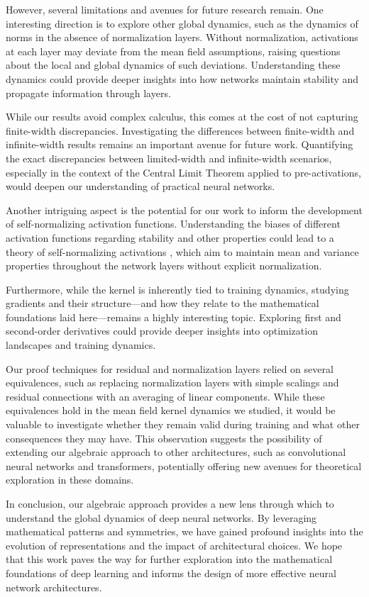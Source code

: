 \documentclass[twoside]{article}
\theoremstyle{definition}
\begin{document}
However, several limitations and avenues for future research remain. One interesting direction is to explore other global dynamics, such as the dynamics of norms in the absence of normalization layers. Without normalization, activations at each layer may deviate from the mean field assumptions, raising questions about the local and global dynamics of such deviations. Understanding these dynamics could provide deeper insights into how networks maintain stability and propagate information through layers.

While our results avoid complex calculus, this comes at the cost of not capturing finite-width discrepancies. Investigating the differences between finite-width and infinite-width results remains an important avenue for future work. Quantifying the exact discrepancies between limited-width and infinite-width scenarios, especially in the context of the Central Limit Theorem applied to pre-activations, would deepen our understanding of practical neural networks.

Another intriguing aspect is the potential for our work to inform the development of self-normalizing activation functions. Understanding the biases of different activation functions regarding stability and other properties could lead to a theory of self-normalizing activations \citep{klambauer2017self}, which aim to maintain mean and variance properties throughout the network layers without explicit normalization.

Furthermore, while the kernel is inherently tied to training dynamics, studying gradients and their structure—and how they relate to the mathematical foundations laid here—remains a highly interesting topic. Exploring first and second-order derivatives could provide deeper insights into optimization landscapes and training dynamics.

Our proof techniques for residual and normalization layers relied on several equivalences, such as replacing normalization layers with simple scalings and residual connections with an averaging of linear components. While these equivalences hold in the mean field kernel dynamics we studied, it would be valuable to investigate whether they remain valid during training and what other consequences they may have. This observation suggests the possibility of extending our algebraic approach to other architectures, such as convolutional neural networks and transformers, potentially offering new avenues for theoretical exploration in these domains.

In conclusion, our algebraic approach provides a new lens through which to understand the global dynamics of deep neural networks. By leveraging mathematical patterns and symmetries, we have gained profound insights into the evolution of representations and the impact of architectural choices. We hope that this work paves the way for further exploration into the mathematical foundations of deep learning and informs the design of more effective neural network architectures.



\end{document}
